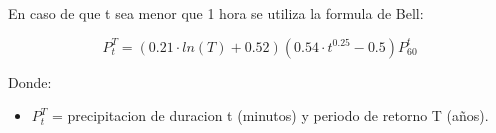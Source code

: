 En caso de que t sea menor que 1 hora se utiliza la formula de Bell:

\begin{equation}
    P_t^T = (0.21 \cdot ln(T) + 0.52)(0.54 \cdot t^{0.25} - 0.5)P_{60}^t
\end{equation}

Donde:
\begin{itemize}
    \item $P_{t}^T$ = precipitacion de duracion t (minutos) y periodo de retorno T (años).
\end{itemize}